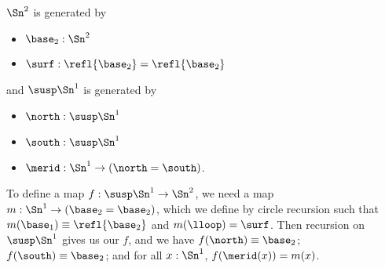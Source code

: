  \soln
$\Sn^{2}$ is generated by



\begin{itemize}
\item  $\base_{2} : \Sn^{2}$

\item  $\surf : \refl{\base_{2}} = \refl{\base_{2}}$

\end{itemize}
and $\susp\Sn^{1}$ is generated by



\begin{itemize}
\item  $\north : \susp\Sn^{1}$

\item  $\south : \susp\Sn^{1}$

\item  $\merid : \Sn^{1} \to (\north = \south)$.

\end{itemize}
To define a map $f : \susp\Sn^{1} \to \Sn^{2}$, we need a map $m : \Sn^{1} \to
(\base_{2} = \base_{2})$, which we define by circle recursion such that
$m(\base_{1}) \equiv \refl{\base_{2}}$ and $m(\lloop) = \surf$.  Then recursion
on $\susp\Sn^{1}$ gives us our $f$, and we have $f(\north) \equiv \base_{2}$;
$f(\south) \equiv \base_{2}$; and for all $x : \Sn^{1}$, $f(\merid(x)) = m(x)$.


